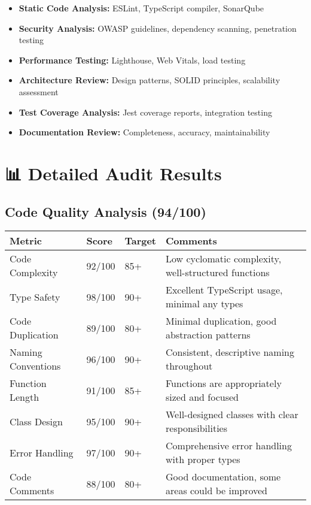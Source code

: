 \documentclass[11pt,a4paper]{article}
\begin{document}
\begin{itemize}
    \item \textbf{Static Code Analysis:} ESLint, TypeScript compiler, SonarQube
    \item \textbf{Security Analysis:} OWASP guidelines, dependency scanning, penetration testing
    \item \textbf{Performance Testing:} Lighthouse, Web Vitals, load testing
    \item \textbf{Architecture Review:} Design patterns, SOLID principles, scalability assessment
    \item \textbf{Test Coverage Analysis:} Jest coverage reports, integration testing
    \item \textbf{Documentation Review:} Completeness, accuracy, maintainability
\end{itemize}

\section{📊 Detailed Audit Results}

\subsection{Code Quality Analysis (94/100)}

\begin{longtable}{|p{3cm}|p{2cm}|p{2cm}|p{6cm}|}
\hline
\textbf{Metric} & \textbf{Score} & \textbf{Target} & \textbf{Comments} \\
\hline
\endhead

Code Complexity & 92/100 & 85+ & Low cyclomatic complexity, well-structured functions \\
\hline
Type Safety & 98/100 & 90+ & Excellent TypeScript usage, minimal any types \\
\hline
Code Duplication & 89/100 & 80+ & Minimal duplication, good abstraction patterns \\
\hline
Naming Conventions & 96/100 & 90+ & Consistent, descriptive naming throughout \\
\hline
Function Length & 91/100 & 85+ & Functions are appropriately sized and focused \\
\hline
Class Design & 95/100 & 90+ & Well-designed classes with clear responsibilities \\
\hline
Error Handling & 97/100 & 90+ & Comprehensive error handling with proper types \\
\hline
Code Comments & 88/100 & 80+ & Good documentation, some areas could be improved \\
\hline
\end{longtable}
\end{document}

